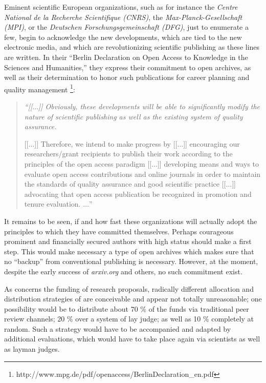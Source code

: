 Eminent scientific European organizations, such as for instance the {\it
Centre National de la Recherche Scientifique (CNRS)}, the {\it
Max-Planck-Gesellschaft (MPI)}, or the {\it Deutschen
Forschungsgemeinschaft (DFG)}, just to enumerate a few, begin to
acknowledge the new developments, which are tied to the new electronic
media, and which are revolutionizing scientific publishing as these lines
are written.  In their ``Berlin Declaration on Open Access to Knowledge
in the Sciences and Humanities,'' they express their commitment to open
archives, as well as their determination to honor such publications
for career planning and quality management
\footnote{
http://www.mpg.de/pdf/openaccess/BerlinDeclaration\_en.pdf }:
\begin{quote} {\em ``[[$\ldots$]] Obviously, these developments will be
able to significantly modify the nature of scientific publishing as well
as the existing system of quality assurance.

[[$\ldots$]] Therefore, we
intend to make progress by [[$\ldots$]] encouraging our
researchers/grant recipients to publish their work according to the
principles of the open access paradigm  [[$\ldots$]] developing means
and ways to evaluate open access contributions and online journals in
order to maintain the standards of quality assurance and good scientific
practice   [[$\ldots$]] advocating that open access publication be
recognized in promotion and tenure evaluation.  $\ldots$'' } \end{quote}

It remains to be seen, if and how fast these organizations will actually adopt the principles
to which they have committed themselves.
Perhaps
courageous prominent and financially secured authors with high
status should make a first step.  This would make necessary a type of
open archives which makes sure that no ``backup'' from conventional
publishing is necessary.
However, at the moment, despite the early success of
{\it arxiv.org} and others, no such commitment exist.

As concerns the funding of research proposals, radically different
allocation and distribution strategies of are conceivable and appear not
totally unreasonable; one possibility would be to distribute about 70 \%
of the funds via traditional peer review channels; 20 \% over a system
of lay judge; as well as 10 \% completely at random.
Such a strategy
would have to be accompanied and adapted by additional evaluations,
which would have to take place again via scientists as well as
layman judges.

